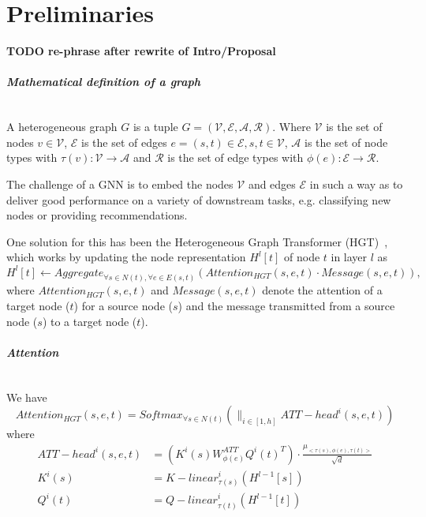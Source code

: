\chapter{Preliminaries}\label{ch:preliminaries}

\textbf{TODO re-phrase after rewrite of Intro/Proposal}

\paragraph{Mathematical definition of a graph}$\,$

A heterogeneous graph \(G\) is a tuple \(G = (\mathcal{V}, \mathcal{E}, \mathcal{A}, \mathcal{R})\). Where \(\mathcal{V}\) is the set of nodes \(v \in \mathcal{V}\),
\(\mathcal{E}\) is the set of edges \(e = (s, t) \in \mathcal{E}, s, t \in \mathcal{V}\), \(\mathcal{A}\) is the set of
node types with \(\tau (v): \mathcal{V} \rightarrow \mathcal{A}\) and \(\mathcal{R}\) is the set of edge types with \(\phi(e): \mathcal{E} \rightarrow \mathcal{R}\).


The challenge of a GNN is to embed the nodes $\mathcal{V}$ and edges $\mathcal{E}$ in such a way as to deliver good performance on a variety of downstream tasks, e.g. classifying new nodes or providing recommendations.

One solution for this has been the Heterogeneous Graph Transformer (HGT)~\cite{hu2020heterogeneous}, 
which works by updating the node representation \(H^l [t]\) of node \(t\) in layer \(l\) as
\[ H^l[t] \leftarrow {Aggregate}_{\forall s \in N(t), \forall e \in E(s, t)} ({Attention}_{HGT}(s, e, t) \cdot Message(s,e,t) ), \]
where $ {Attention}_{HGT}(s, e, t) $ and $ Message(s,e,t) $ denote the attention of a target node ($ t $) for a source node ($ s $) and the message transmitted from a source node ($ s $) to a target node ($ t $).


\paragraph{Attention}$\,$

We have 
\[ {Attention}_{HGT} (s, e, t) = Softmax_{\forall s \in N(t)} ( \|_{i \in [1, h]} ATT-head^i (s, e, t)) \]
where
\begin{align*}
    ATT-head^i (s,e,t ) &= (K^i (s) W^{ATT}_{\phi(e)} Q^i (t)^T ) \cdot \frac{\mu_{<\tau(s), \phi(e), \tau(t)>}}{\sqrt{d}} \\
    K^i (s) &= {K-linear}^{i}_{\tau(s)} (H^{l-1}[s]) \\
    Q^i (t) &= {Q-linear}^{i}_{\tau(t)} (H^{l-1}[t]) \\
\end{align*}

